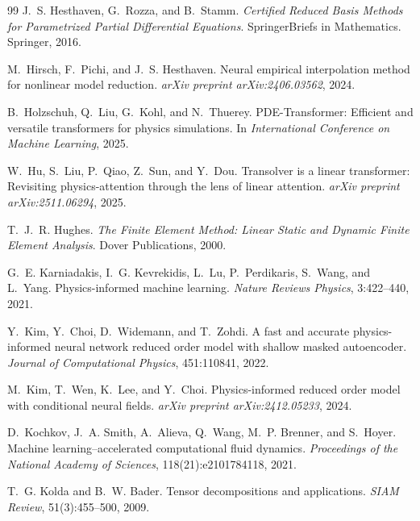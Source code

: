 \documentclass{article}
\begin{document}
\begin{thebibliography}{99}
J.~S. Hesthaven, G.~Rozza, and B.~Stamm.
\newblock \emph{Certified Reduced Basis Methods for Parametrized
Partial Differential Equations}.
\newblock SpringerBriefs in Mathematics. Springer, 2016.

M.~Hirsch, F.~Pichi, and J.~S. Hesthaven.
\newblock Neural empirical interpolation method for nonlinear model
reduction.
\newblock \emph{arXiv preprint arXiv:2406.03562}, 2024.

B.~Holzschuh, Q.~Liu, G.~Kohl, and N.~Thuerey.
\newblock PDE-Transformer: Efficient and versatile transformers for
physics simulations.
\newblock In \emph{International Conference on Machine Learning}, 2025.

W.~Hu, S.~Liu, P.~Qiao, Z.~Sun, and Y.~Dou.
\newblock Transolver is a linear transformer: Revisiting
physics-attention through the lens of linear attention.
\newblock \emph{arXiv preprint arXiv:2511.06294}, 2025.

T.~J.~R. Hughes.
\newblock \emph{The Finite Element Method: Linear Static and Dynamic
Finite Element Analysis}.
\newblock Dover Publications, 2000.

G.~E. Karniadakis, I.~G. Kevrekidis, L.~Lu, P.~Perdikaris, S.~Wang, and
L.~Yang.
\newblock Physics-informed machine learning.
\newblock \emph{Nature Reviews Physics}, 3:422--440, 2021.

Y.~Kim, Y.~Choi, D.~Widemann, and T.~Zohdi.
\newblock A fast and accurate physics-informed neural network reduced
order model with shallow masked autoencoder.
\newblock \emph{Journal of Computational Physics}, 451:110841, 2022.

M.~Kim, T.~Wen, K.~Lee, and Y.~Choi.
\newblock Physics-informed reduced order model with conditional neural
fields.
\newblock \emph{arXiv preprint arXiv:2412.05233}, 2024.

D.~Kochkov, J.~A. Smith, A.~Alieva, Q.~Wang, M.~P. Brenner, and
S.~Hoyer.
\newblock Machine learning--accelerated computational fluid dynamics.
\newblock \emph{Proceedings of the National Academy of Sciences},
118(21):e2101784118, 2021.

T.~G. Kolda and B.~W. Bader.
\newblock Tensor decompositions and applications.
\newblock \emph{SIAM Review}, 51(3):455--500, 2009.


\end{thebibliography}
\end{document}
